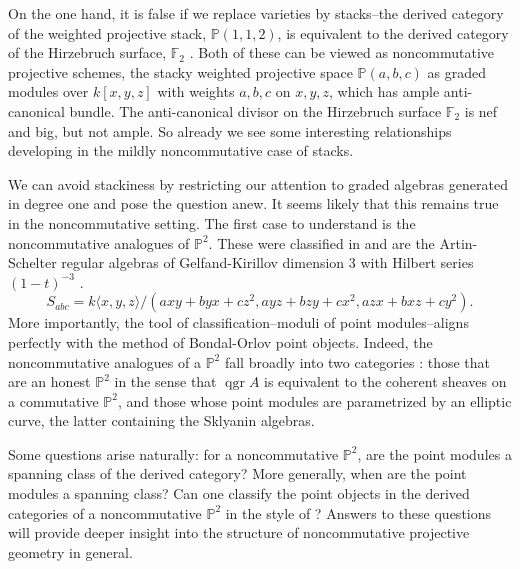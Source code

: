 \documentclass[11pt]{article}
\begin{document}
On the one hand, it is false if we replace varieties by stacks--the derived category of the weighted projective stack, $\mathbb{P}(1,1,2)$, is equivalent to the derived category of the Hirzebruch surface, $\mathbb{F}_2$ \cite{BF12}.
Both of these can be viewed as noncommutative projective schemes, the stacky weighted projective space $\mathbb{P}(a,b,c)$ as graded modules over $k[x,y,z]$ with weights $a,b,c$ on $x,y,z$, which has ample anti-canonical bundle.
The anti-canonical divisor on the Hirzebruch surface $\mathbb{F}_2$ is nef and big, but not ample.
So already we see some interesting relationships developing in the mildly noncommutative case of stacks.

We can avoid stackiness by restricting our attention to graded algebras generated in degree one and pose the question anew.
It seems likely that this remains true in the noncommutative setting.
The first case to understand is the noncommutative analogues of $\mathbb{P}^2$.
These were classified in \cite{ATV,Stephenson96,Stephenson97} and are the Artin-Schelter regular algebras \cite{AS87} of Gelfand-Kirillov dimension 3 with Hilbert series $(1-t)^{-3}$ \cite[Section 11]{SVdB01}.
$$S_{abc} = k\langle x,y,z \rangle/(axy + byx + cz^2, ayz + bzy + cx^2, azx + bxz + cy^2).$$
More importantly, the tool of classification--moduli of point modules--aligns perfectly with the method of Bondal-Orlov point objects.
Indeed, the noncommutative analogues of a $\mathbb{P}^2$ fall broadly into two categories \cite{Stafford02}: those that are an honest $\mathbb{P}^2$ in the sense that $\operatorname{qgr} A$ is equivalent to the coherent sheaves on a commutative $\mathbb{P}^2$, and those whose point modules are parametrized by an elliptic curve, the latter containing the Sklyanin algebras.

Some questions arise naturally: for a noncommutative $\mathbb{P}^2$, are the point modules a spanning class of the derived category?
More generally, when are the point modules a spanning class?
Can one classify the point objects in the derived categories of a noncommutative $\mathbb{P}^2$ in the style of \cite{Bondal-Orlov}?
Answers to these questions will provide deeper insight into the structure of noncommutative projective geometry in general.

\end{document}
